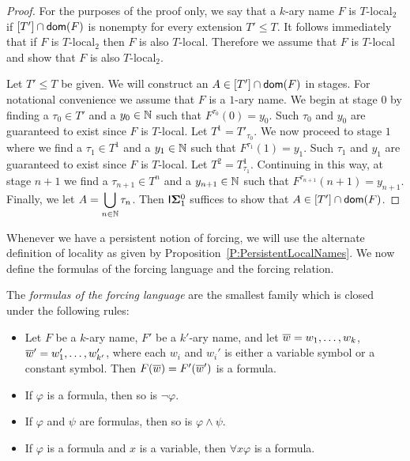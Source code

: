 \begin{proof}
For the purposes of the proof only, we say that a $k$-ary name $F$ is
$T$-local$_2$ if $[T']\cap\mathsf{dom}(F)$ is nonempty for every extension $T'\leq T$.
It follows immediately that if $F$ is $T$-local$_2$ then $F$ is also $T$-local.
Therefore we assume that $F$ is $T$-local and show that $F$ is also $T$-local$_2$.

Let $T'\leq T$ be given.  We will construct an $A\in[T']\cap\mathsf{dom}(F)$ in stages.
For notational convenience we assume that $F$ is a $1$-ary name.
We begin at stage $0$ by finding a $\tau_0\in T'$ and a $y_0\in\mathbb{N}$ such that $F^{\tau_0}(0)=y_0$.
Such $\tau_0$ and $y_0$ are guaranteed to exist since $F$ is $T$-local.
Let $T^1=T'_{\tau_0}$.
We now proceed to stage $1$ where we find a $\tau_1\in T^1$
and a $y_1\in\mathbb{N}$ such that $F^{\tau_1}(1)=y_1$.
Such $\tau_1$ and $y_1$ are guaranteed to exist since $F$ is $T$-local.
Let $T^2=T^1_{\tau_1}$.
Continuing in this way, at stage $n+1$ we find a $\tau_{n+1}\in T^n$
and a $y_{n+1}\in\mathbb{N}$ such that $F^{\tau_{n+1}}(n+1)=y_{n+1}$.
Finally, we let $\displaystyle A=\bigcup_{n\in\mathbb{N}}\tau_n$.
Then $\mathsf{I}{\mathbf{\Sigma}^0_1}$ suffices to show that $A\in[T']\cap\mathsf{dom}(F)$.
\end{proof}

Whenever we have a persistent notion of forcing,
we will use the alternate definition of locality as given
by Proposition~\ref{P:PersistentLocalNames}.
We now define the formulas of the forcing language and the forcing relation.

\begin{definition}\label{D:forcingLang}
The \textit{formulas of the forcing language} are the smallest family which is closed under the following rules:
\begin{itemize}
\item Let $F$ be a $k$-ary  name, $F'$ be a $k'$-ary name, and let
		$\overline{w}=w_1,\ldots,w_k$, $\overline{w}'=w_1',\ldots,w_{k'}'$, where each $w_i$ and $w_i'$
		is either a variable symbol or a constant symbol.
		Then $F(\overline{w})=F'(\overline{w}')$ is a formula.
\item If $\varphi$ is a formula, then so is $\neg\varphi$.
\item If $\varphi$ and $\psi$ are formulas, then so is $\varphi\land\psi$.
\item If $\varphi$ is a formula and $x$ is a variable, then $\forall x\varphi$ is a formula.
\end{itemize}
\end{definition}

